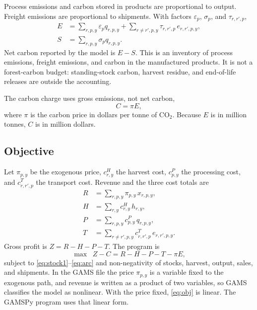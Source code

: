 \documentclass[11pt]{article}
\begin{document}
Process emissions and carbon stored in products are proportional to output. Freight emissions are proportional to shipments. With factors $\varepsilon_p$, $\sigma_p$, and $\tau_{r,r',p}$,
\begin{align}
E &= \sum_{r,p,y} \varepsilon_p q_{r,p,y}
+ \sum_{r \ne r',p,y} \tau_{r,r',p}\, e_{r,r',p,y}, \label{eq:E} \\
S &= \sum_{r,p,y} \sigma_p q_{r,p,y}. \label{eq:S}
\end{align}
Net carbon reported by the model is $E - S$. This is an inventory of process emissions, freight emissions, and carbon in the manufactured products. It is not a forest-carbon budget: standing-stock carbon, harvest residue, and end-of-life releases are outside the accounting.

The carbon charge uses gross emissions, not net carbon,
\begin{equation}
C = \pi E,
\label{eq:C}
\end{equation}
where $\pi$ is the carbon price in dollars per tonne of CO$_2$. Because $E$ is in million tonnes, $C$ is in million dollars.

\subsection{Objective}

Let $\pi_{p,y}$ be the exogenous price, $c^H_{r,y}$ the harvest cost, $c^P_{p,y}$ the processing cost, and $c^T_{r,r',p}$ the transport cost. Revenue and the three cost totals are
\begin{align}
R &= \sum_{r,p,y} \pi_{p,y}\, x_{r,p,y}, \label{eq:R} \\
H &= \sum_{r,y} c^H_{r,y}\, h_{r,y}, \\
P &= \sum_{r,p,y} c^P_{p,y}\, q_{r,p,y}, \\
T &= \sum_{r \ne r',p,y} c^T_{r,r',p}\, e_{r,r',p,y}.
\end{align}
Gross profit is $Z = R - H - P - T$. The program is
\begin{equation}
\max \;\; Z - C = R - H - P - T - \pi E,
\label{eq:obj}
\end{equation}
subject to \eqref{eq:stock1}--\eqref{eq:arc} and non-negativity of stocks, harvest, output, sales, and shipments. In the GAMS file the price $\pi_{p,y}$ is a variable fixed to the exogenous path, and revenue is written as a product of two variables, so GAMS classifies the model as nonlinear. With the price fixed, \eqref{eq:obj} is linear. The GAMSPy program uses that linear form.
\end{document}
